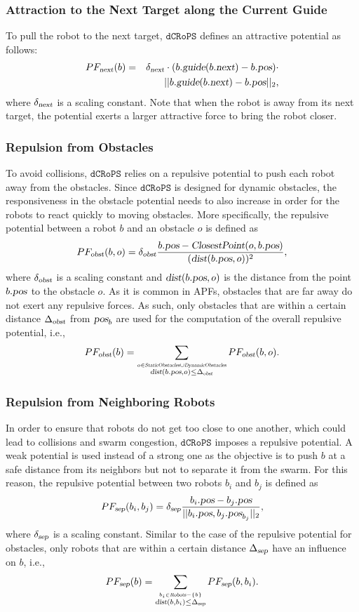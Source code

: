 \documentclass[letterpaper, 10pt, conference]{ieeeconf}
\newcommand{\Acronym}[1]{\ensuremath{{{\texttt{#1}}}}}
\newcommand{\Var}[1]{\ensuremath{{{\textsl{#1}}}}}
\newcommand{\Name}{\Acronym{dCRoPS}}
\begin{document}
\subsubsection{Attraction to the Next Target along the Current Guide}
\label{sec:PFnext}
To pull the
robot to the next target, $\Name$ defines an attractive potential as follows:
\begin{eqnarray*}
PF_\Var{next}(b) &=&  
\delta_\Var{next}\cdot (b.\Var{guide}(b.\Var{next}) - b.\Var{pos}) \cdot \\
& & ||b.\Var{guide}(b.\Var{next}) - b.\Var{pos}||_2,
\end{eqnarray*}
where $\delta_\Var{next}$ is a scaling constant. Note that when the
robot is away from its next target, the potential exerts a larger
attractive force to bring the robot closer.


\subsubsection{Repulsion from Obstacles}
\label{sec:PFobst}
To avoid collisions, $\Name$ relies on a repulsive potential to push
each robot away from the obstacles. Since $\Name$ is
designed for dynamic obstacles, the responsiveness in the
obstacle potential needs to also increase in order for the
robots to react quickly to moving obstacles. More specifically,
the repulsive potential between a robot $b$ and an obstacle $o$ is
defined as
$$
PF_\Var{obst}(b, o) = \delta_\Var{obst} \frac{b.\Var{pos}
- \Var{ClosestPoint}(o, b.\Var{pos})}{(\Var{dist}(b.\Var{pos}, o))^2},
$$
where $\delta_\Var{obst}$ is a scaling constant and
$\Var{dist}(b.\Var{pos}, o)$ is the distance from the point
$b.\Var{pos}$ to the obstacle $o$.
As it is common in APFs, obstacles that are far away do not exert any
repulsive forces. As such, only obstacles that are within a certain
distance $\Delta_\Var{obst}$ from $\Var{pos}_b$ are used for the
computation of the overall repulsive potential, i.e.,
$$
PF_\Var{obst}(b) = \sum_{\stackrel{o \in
    \Var{StaticObstacles} \cup \Var{DynamicObstacles}}{\Var{dist}(b.\Var{pos}, o) \leq \Delta_\Var{obst}}}  PF_\Var{obst}(b, o).
$$

\subsubsection{Repulsion from Neighboring Robots}
\label{sec:PFsep}
In order to ensure that robots do not get too close to one another,
which could lead to collisions and swarm congestion, $\Name$ imposes a
repulsive potential. A weak potential is used instead of a strong one
as the objective is to push $b$ at a safe distance from its neighbors
but not to separate it from the swarm. For this reason, the repulsive
potential between two robots $b_i$ and $b_j$ is defined as
$$
PF_\Var{sep}(b_i, b_j) = \delta_\Var{sep} \frac{b_i.\Var{pos}-b_j.\Var{pos}}{
||b_i.\Var{pos}, b_j.\Var{pos}_{b_j}||_2},
$$
where $\delta_\Var{sep}$ is a scaling constant. Similar to the case of
the repulsive potential for obstacles, only robots that are within a
certain distance $\Delta_\Var{sep}$ have an influence on $b$, i.e.,
$$
PF_\Var{sep}(b) = \sum_{\stackrel{b_i \in
    \Var{Robots} - \{b\}}{\Var{dist}(b, b_i) \leq \Delta_\Var{sep}}}  PF_\Var{sep}(b, b_i).
$$
\end{document}
